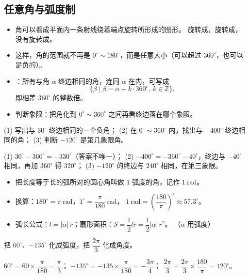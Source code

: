 \begin{explore}

\subsection{任意角与弧度制}

\begin{itemize}
  \item 角可以看成平面内一条射线绕着端点旋转所形成的图形。
        旋转成，旋转成，没有旋转成。
  \item 这样，角的范围就不再是 $0^\circ\sim180^\circ$，而是任意大小（可以超过 $360^\circ$，也可以是负的）。
  \item {}：所有与角 $\alpha$ 终边相同的角，连同 $\alpha$ 在内，可写成
        \[
          \{\beta\mid\beta=\alpha+k\cdot360^\circ,\ k\in\mathbb{Z}\}.
        \]
        即相差 $360^\circ$ 的整数倍。
  \item 判断象限：把角化到 $0^\circ\sim360^\circ$ 之间再看终边落在哪个象限。
\end{itemize}

\begin{example}
(1) 写出与 $30^\circ$ 终边相同的一个负角；
(2) 在 $0^\circ\sim360^\circ$ 内，找出与 $-400^\circ$ 终边相同的角；
(3) 判断 $-120^\circ$ 是第几象限角。
\end{example}
\begin{solution}
(1) $30^\circ-360^\circ=-330^\circ$（答案不唯一）；
(2) $-400^\circ=-360^\circ-40^\circ$，终边与 $-40^\circ$ 相同，再加 $360^\circ$ 得 $320^\circ$；
(3) $-120^\circ$ 的终边与 $240^\circ$ 相同，在第三象限。
\end{solution}

\begin{itemize}
  \item 把长度等于长的弧所对的圆心角叫做 $1$ 弧度的角，记作 $1\ \text{rad}$。
  \item 换算：$180^\circ=\pi\ \text{rad}$，$1^\circ=\dfrac{\pi}{180}\ \text{rad}$，
        $1\ \text{rad}=\left(\dfrac{180}{\pi}\right)^\circ\approx57.3^\circ$。
  \item 弧长公式：$l=|\alpha|\,r$；扇形面积：$S=\dfrac12lr=\dfrac12|\alpha|\,r^2$。
        （$\alpha$ 用弧度）
\end{itemize}

\begin{example}
把 $60^\circ$、$-135^\circ$ 化成弧度，把 $\dfrac{2\pi}{3}$ 化成角度。
\end{example}
\begin{solution}
$60^\circ=60\times\dfrac{\pi}{180}=\dfrac{\pi}{3}$；
$-135^\circ=-135\times\dfrac{\pi}{180}=-\dfrac{3\pi}{4}$；
$\dfrac{2\pi}{3}=\dfrac{2\pi}{3}\times\dfrac{180}{\pi}=120^\circ$。
\end{solution}


\end{explore}
